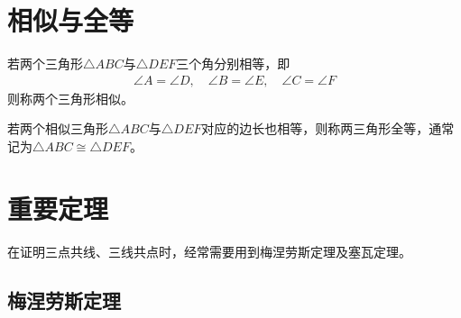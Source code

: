 \section{相似与全等}
\label{sec:similar-and-congruent}

\begin{definition}
  若两个三角形$\triangle ABC$与$\triangle DEF$三个角分别相等，即
  \begin{align*}
    \angle A = \angle D,\quad \angle B = \angle E,\quad \angle C = \angle F
  \end{align*}
  则称两个三角形相似。
\end{definition}

\begin{definition}[全等，Congruent]
  若两个相似三角形$\triangle ABC$与$\triangle DEF$对应的边长也相等，则称两三角形全等，通常记为$\triangle ABC \cong \triangle DEF$。
\end{definition}

\section{重要定理}
\label{sec:important-triangle-theorems}

在证明三点共线、三线共点时，经常需要用到梅涅劳斯定理及塞瓦定理。

\subsection{梅涅劳斯定理}
\label{sec:Menelaus's-theorem}

